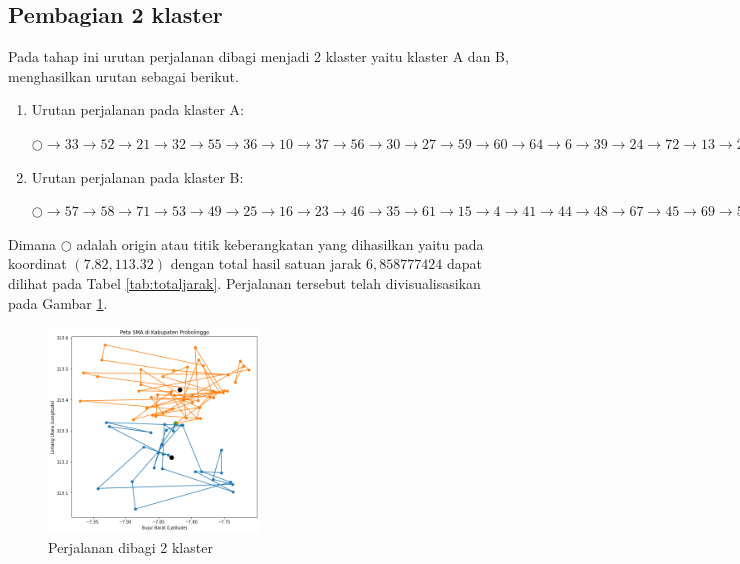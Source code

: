 \subsection{Pembagian 2 klaster}

Pada tahap ini urutan perjalanan dibagi menjadi 2 klaster yaitu klaster A dan B, menghasilkan urutan sebagai berikut.

\begin{enumerate}
\item Urutan perjalanan pada klaster A:

$\bigcirc \to 33 \to 52 \to 21 \to 32 \to 55 \to 36 \to 10 \to 37 \to 56 \to 30 \to 27 \to 59 \to 60 \to 64 \to 6 \to 39 \to 24 \to 72 \to 13 \to 29 \to 11 \to 63 \to 9 \to 17 \to 47 \to 38 \to \bigcirc$

\item Urutan perjalanan pada klaster B:

$\bigcirc \to 57 \to 58 \to 71 \to 53 \to 49 \to 25 \to 16 \to 23 \to 46 \to 35 \to 61 \to 15 \to 4 \to 41 \to 44 \to 48 \to 67 \to 45 \to 69 \to 5 \to 8 \to 42 \to 50 \to 22 \to 51 \to 74 \to 26 \to 19 \to 34 \to 43 \to 65 \to 12 \to 28 \to 14 \to 70 \to 66 \to 3 \to 40 \to 20 \to 62 \to 31 \to 18 \to 7 \to 54 \to 68 \to 73 \to 75 \to 2 \to 1 \to \bigcirc$

\end{enumerate}

Dimana $\bigcirc$ adalah origin atau titik keberangkatan yang dihasilkan yaitu pada koordinat $(7.82, 113.32)$ dengan total hasil satuan jarak $6,858777424$ dapat dilihat pada Tabel \ref{tab:totaljarak}. Perjalanan tersebut telah divisualisasikan pada Gambar \ref{fig:hasil_mtsp2}.

\begin{figure}[H]
\centering
\includegraphics[width=0.5\textwidth]{Gambar/hasil_mtsp/2}
\caption{Perjalanan dibagi 2 klaster}
\label{fig:hasil_mtsp2}
\end{figure}

